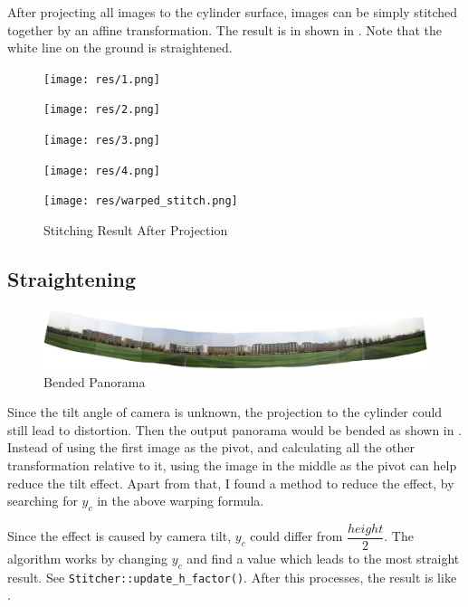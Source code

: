 After projecting all images to the cylinder surface, images can be
simply stitched together by an affine transformation.
The result is in shown in . Note that the white line on
the ground is straightened.
\begin{figure}[H]
  \centering
  \begin{minipage}[b]{0.24\linewidth}
    \texttt{[image: res/1.png]}
  \end{minipage}
  \begin{minipage}[b]{0.24\linewidth}
    \texttt{[image: res/2.png]}
  \end{minipage}
  \begin{minipage}[b]{0.24\linewidth}
    \texttt{[image: res/3.png]}
  \end{minipage}
  \begin{minipage}[b]{0.24\linewidth}
    \texttt{[image: res/4.png]}
  \end{minipage}

  \texttt{[image: res/warped\_stitch.png]}
  \caption{Stitching Result After Projection\label{fig:cyl}}
\end{figure}

\subsection{Straightening}
\begin{figure}[H]
  \centering
  \includegraphics[width=\textwidth]{res/bend.jpg}
  \caption{Bended Panorama\label{fig:bend}}
\end{figure}

Since the tilt angle of camera is unknown,
the projection to the cylinder could still lead to distortion.
Then the output panorama would be bended as shown in .
Instead of using the first image as the pivot, and calculating all the other transformation relative to it,
using the image in the middle as the pivot can help reduce the tilt effect.
Apart from that, I found a method to reduce the effect, by searching for $ y_c$
in the above warping formula.

Since the effect is caused by camera tilt, $ y_c$ could differ from $ \dfrac{height}{2}$.
The algorithm works by changing $ y_c$ and find a value which leads to the most straight result. See \verb|Stitcher::update_h_factor()|.
After this processes, the result is like .

